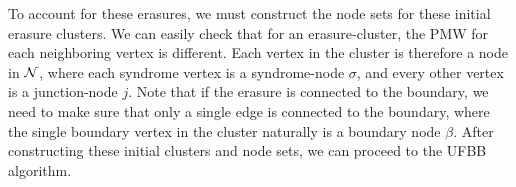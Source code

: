 To account for these erasures, we must construct the node sets for these initial erasure clusters. We can easily check that for an erasure-cluster, the PMW for each neighboring vertex is different. Each vertex in the cluster is therefore a node in $\mathcal{N}$, where each syndrome vertex is a syndrome-node $\sigma$, and every other vertex is a junction-node $j$. Note that if the erasure is connected to the boundary, we need to make sure that only a single edge is connected to the boundary, where the single boundary vertex in the cluster naturally is a boundary node $\beta$. After constructing these initial clusters and node sets, we can proceed to the UFBB algorithm.  